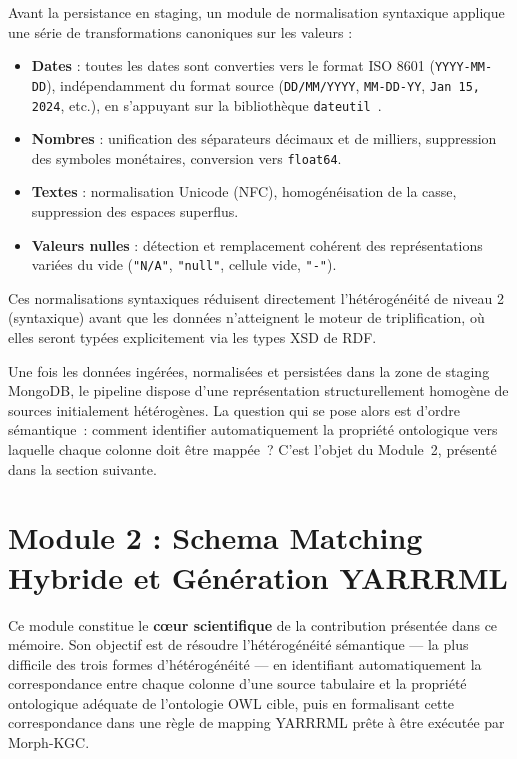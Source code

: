 Avant la persistance en staging, un module de normalisation syntaxique applique
une série de transformations canoniques sur les valeurs :
\begin{itemize}
    \item \textbf{Dates} : toutes les dates sont converties vers le format
          ISO 8601 (\texttt{YYYY-MM-DD}), indépendamment du format source
          (\texttt{DD/MM/YYYY}, \texttt{MM-DD-YY}, \texttt{Jan 15, 2024},
          etc.), en s'appuyant sur la bibliothèque \texttt{dateutil}~\cite{dateutil2024}.
    \item \textbf{Nombres} : unification des séparateurs décimaux et de milliers,
          suppression des symboles monétaires, conversion vers \texttt{float64}.
    \item \textbf{Textes} : normalisation Unicode (NFC), homogénéisation de la
          casse, suppression des espaces superflus.
    \item \textbf{Valeurs nulles} : détection et remplacement cohérent des
          représentations variées du vide (\texttt{"N/A"}, \texttt{"null"},
          cellule vide, \texttt{"-"}).
\end{itemize}
Ces normalisations syntaxiques réduisent directement l'hétérogénéité de niveau 2
(syntaxique) avant que les données n'atteignent le moteur de triplification, où
elles seront typées explicitement via les types XSD de RDF.

\medskip
Une fois les données ingérées, normalisées et persistées dans la zone de
staging MongoDB, le pipeline dispose d'une représentation structurellement
homogène de sources initialement hétérogènes. La question qui se pose alors
est d'ordre sémantique~: comment identifier automatiquement la propriété
ontologique vers laquelle chaque colonne doit être mappée~? C'est l'objet
du Module~2, présenté dans la section suivante.

\section{Module 2 : Schema Matching Hybride et Génération YARRRML}
\label{sec:module_matching}

Ce module constitue le \textbf{cœur scientifique} de la contribution présentée
dans ce mémoire.
Son objectif est de résoudre l'hétérogénéité sémantique --- la plus difficile des
trois formes d'hétérogénéité --- en identifiant automatiquement la correspondance
entre chaque colonne d'une source tabulaire et la propriété ontologique adéquate
de l'ontologie OWL cible, puis en formalisant cette correspondance dans une règle
de mapping YARRRML prête à être exécutée par Morph-KGC.

